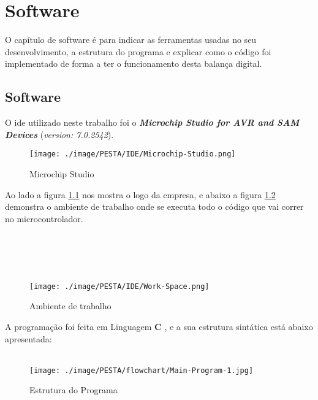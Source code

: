 \chapter{Software}
O capítulo de software é para indicar as ferramentas usadas no seu desenvolvimento, a estrutura do programa e explicar como o código foi implementado de forma a ter o funcionamento desta balança digital.
\section{Software}
O \ac{ide} utilizado neste trabalho foi o \textbf{\textit{{Microchip Studio for AVR\textsuperscript{\textregistered} and SAM Devices}}} (\textit{version: 7.0.2542}).
\\
\begin{minipage}[!b]{.55\linewidth}
	\begin{figure}[H]
		\captionsetup{justification=raggedright,singlelinecheck=false}
		\texttt{[image: ./image/PESTA/IDE/Microchip-Studio.png]}
		\caption{Microchip Studio}
		\label{Microchip-Studio}
	\end{figure}
\end{minipage}
\begin{minipage}[!b]{.45\linewidth}
	Ao lado a figura \ref{Microchip-Studio} nos mostra o logo da empresa, e abaixo a figura \ref{Work-Space} demonstra o ambiente de trabalho onde se executa todo o código que vai correr no microcontrolador.
	\\
	\\
	\\
	\\
	\\
\end{minipage}
\begin{figure}[H]
	\centering
	\texttt{[image: ./image/PESTA/IDE/Work-Space.png]}
	\caption{Ambiente de trabalho}
	\label{Work-Space}
\end{figure}
A programação foi feita em Linguagem \textbf{C} \cite{book-11}, e a sua estrutura sintática está abaixo apresentada:
\\
\\
\begin{figure}[H]
	\centering
	\texttt{[image: ./image/PESTA/flowchart/Main-Program-1.jpg]}
	\caption{Estrutura do Programa}
	\label{Main_Program_1}
\end{figure}
